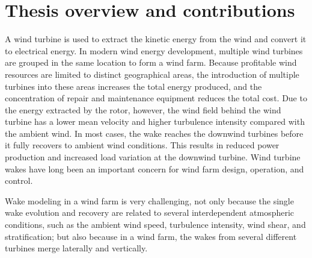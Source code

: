 \documentclass{umthesis}
\begin{document}
\tableofcontents                %
\listoftables                   %
\listoffigures                  %



\mainmatter   %

\chapter{Thesis overview and contributions}
A wind turbine is used to extract the kinetic energy from the wind and convert it to electrical energy. In modern wind energy development, multiple wind turbines are grouped in the same location to form a wind farm. Because profitable wind resources are limited to distinct geographical areas, the introduction of multiple turbines into these areas increases the total energy produced, and the concentration of repair and maintenance equipment reduces the total cost. Due to the energy extracted by the rotor, however, the wind field behind the wind turbine has a lower mean velocity and higher turbulence intensity compared with the ambient wind. In most cases, the wake reaches the downwind turbines before it fully recovers to ambient wind conditions. This results in reduced power production and increased load variation at the downwind turbine. Wind turbine wakes have long been an important concern for wind farm design, operation, and control.

Wake modeling in a wind farm is very challenging, not only because the single wake evolution and recovery are related to several interdependent atmospheric conditions, such as the ambient wind speed, turbulence intensity, wind shear, and stratification; but also because in a wind farm, the wakes from several different turbines merge laterally and vertically.
\end{document}
